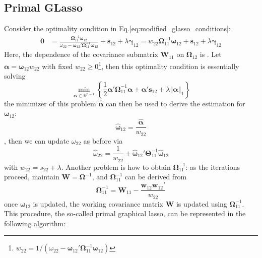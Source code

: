 \documentclass[twoside]{article}
\begin{document}
\subsection{Primal GLasso}
Consider the optimality condition in Eq.\ref{eq:modified_glasso_conditions}:
\begin{align*}
    \mathbf{0} &= \frac{\boldsymbol{\Omega}^{-1}_{11}\boldsymbol{\omega}_{12}}{\omega_{22}-\boldsymbol{\omega}_{12}'\boldsymbol{\Omega}^{-1}_{11}\boldsymbol{\omega}_{12}} + \mathbf{s}_{12} + \lambda\boldsymbol{\gamma}_{12} = w_{22}\boldsymbol{\Omega}^{-1}_{11}\boldsymbol{\omega}_{12} + \mathbf{s}_{12} + \lambda\boldsymbol{\gamma}_{12}
\end{align*}
Here, the dependence of the covariance submatrix $\mathbf{W}_{11}$ on $\boldsymbol{\Omega}_{12}$ is . Let $\boldsymbol{\alpha} = \boldsymbol{\omega}_{12}w_{22}$ with fixed $w_{22}\geq 0$\footnote{$w_{22}= 1/(\omega_22-\boldsymbol{\omega}_{12}'\boldsymbol{\Omega}_{11}^{-1}\boldsymbol{\omega}_{12})$}, then this optimality condition is essentially solving
$$
\min_{\boldsymbol{\alpha}\in\mathbb{R}^{p-1}}\left\{ \frac{1}{2}\boldsymbol{\alpha'\Omega}_{11}^{-1}\boldsymbol{\alpha} + \boldsymbol{\alpha}'\mathbf{s}_{12} + \lambda\left\Vert \boldsymbol{\alpha}\right\Vert _1 \right\}
$$
the minimizer of this problem $\hat{\boldsymbol{\alpha}}$ can then be used to derive the estimation for $\boldsymbol{\omega}_{12}$: $$\hat{\boldsymbol{\omega}}_{12} = \frac{\hat{\boldsymbol{\alpha}}}{w_{22}}$$, then we can update $\omega_{22}$ as before via $$ \hat{\omega}_{22} = \frac{1}{w_{22}} + \hat{\boldsymbol{\omega}}_{12}'\boldsymbol{\Theta}^{-1}_{11} \hat{\boldsymbol{\omega}}_{12}$$ with $w_{22}=s_{22}+\lambda$. Another problem is how to obtain $\boldsymbol{\Omega}^{-1}_{11}$: as the iterations proceed, maintain $\mathbf{W}=\boldsymbol{\Omega}^{-1}$, and $\boldsymbol{\Omega}^{-1}_{11}$ can be derived from $$ \boldsymbol{\Omega}^{-1}_{11}=\mathbf{W}_{11}-\frac{\mathbf{w}_{12}\mathbf{w}_{12}'}{w_{22}} $$
once $\boldsymbol{\omega}_{12}$ is updated, the  working covariance matrix $\mathbf{W}$ is updated using $\boldsymbol{\Omega}^{-1}_{11}$. This procedure, the so-called primal graphical lasso, can be represented in the following algorithm:
\end{document}
